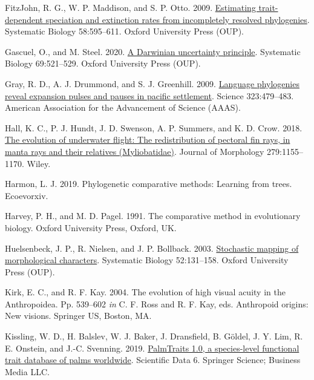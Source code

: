 \documentclass{article}
\newlength{\cslhangindent}
\newenvironment{CSLReferences}[2] %
 {\begin{list}{}{%
  \setlength{\itemindent}{0pt}
  \setlength{\leftmargin}{0pt}
  \setlength{\parsep}{0pt}
  \ifodd #1
   \setlength{\leftmargin}{\cslhangindent}
   \setlength{\itemindent}{-1\cslhangindent}
  \fi
  \setlength{\itemsep}{#2\baselineskip}}}
 {\end{list}}
\begin{document}
\begin{CSLReferences}{1}{0}
FitzJohn, R. G., W. P. Maddison, and S. P. Otto. 2009. \href{https://doi.org/10.1093/sysbio/syp067}{Estimating trait-dependent speciation and extinction rates from incompletely resolved phylogenies}. Systematic Biology 58:595--611. Oxford University Press (OUP).

Gascuel, O., and M. Steel. 2020. \href{https://doi.org/10.1093/sysbio/syz054}{A {D}arwinian uncertainty principle}. Systematic Biology 69:521--529. Oxford University Press (OUP).

Gray, R. D., A. J. Drummond, and S. J. Greenhill. 2009. \href{https://doi.org/10.1126/science.1166858}{Language phylogenies reveal expansion pulses and pauses in pacific settlement}. Science 323:479--483. American Association for the Advancement of Science (AAAS).

Hall, K. C., P. J. Hundt, J. D. Swenson, A. P. Summers, and K. D. Crow. 2018. \href{https://doi.org/10.1002/jmor.20837}{The evolution of underwater flight: The redistribution of pectoral fin rays, in manta rays and their relatives ({M}yliobatidae)}. Journal of Morphology 279:1155--1170. Wiley.

Harmon, L. J. 2019. Phylogenetic comparative methods: Learning from trees. Ecoevorxiv.

Harvey, P. H., and M. D. Pagel. 1991. The comparative method in evolutionary biology. Oxford University Press, Oxford, UK.

Huelsenbeck, J. P., R. Nielsen, and J. P. Bollback. 2003. \href{https://doi.org/10.1080/10635150390192780}{Stochastic mapping of morphological characters}. Systematic Biology 52:131--158. Oxford University Press (OUP).

Kirk, E. C., and R. F. Kay. 2004. The evolution of high visual acuity in the {A}nthropoidea. Pp. 539--602 \emph{in} C. F. Ross and R. F. Kay, eds. Anthropoid origins: New visions. Springer US, Boston, MA.

Kissling, W. D., H. Balslev, W. J. Baker, J. Dransfield, B. Göldel, J. Y. Lim, R. E. Onstein, and J.-C. Svenning. 2019. \href{https://doi.org/10.1038/s41597-019-0189-0}{PalmTraits 1.0, a species-level functional trait database of palms worldwide}. Scientific Data 6. Springer Science; Business Media LLC.


\end{CSLReferences}
\end{document}
